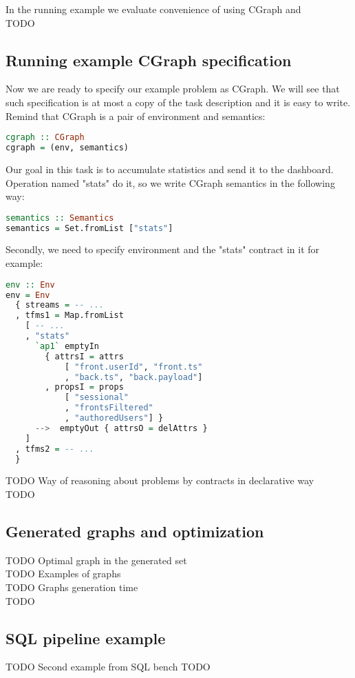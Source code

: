 \label{sec:eval}

In the running example we evaluate convenience of using CGraph and \\
TODO

\subsection{Running example CGraph specification}

Now we are ready to specify our example problem as CGraph.
We will see that such specification is at most a copy of the task description and it is easy to write.
Remind that CGraph is a pair of environment and semantics:
\begin{lstlisting}[language=Haskell]
cgraph :: CGraph
cgraph = (env, semantics)
\end{lstlisting}

Our goal in this task is to accumulate statistics and send it to the dashboard.
Operation named "stats" do it, so we write CGraph semantics in the following way:
\begin{lstlisting}[language=Haskell]
semantics :: Semantics
semantics = Set.fromList ["stats"]
\end{lstlisting}

Secondly, we need to specify environment and the "stats" contract in it for example:
\begin{lstlisting}[language=Haskell]
env :: Env
env = Env
  { streams = -- ...
  , tfms1 = Map.fromList
    [ -- ...
    , "stats"
      `ap1` emptyIn
        { attrsI = attrs
            [ "front.userId", "front.ts"
            , "back.ts", "back.payload"]
        , propsI = props
            [ "sessional"
            , "frontsFiltered"
            , "authoredUsers"] }
      -->  emptyOut { attrsO = delAttrs }
    ]
  , tfms2 = -- ...
  }
\end{lstlisting}



TODO Way of reasoning about problems by contracts in declarative way \\
TODO

\subsection{Generated graphs and optimization}



TODO Optimal graph in the generated set \\
TODO Examples of graphs \\
TODO Graphs generation time \\
TODO

\subsection{SQL pipeline example}

TODO Second example from SQL bench
TODO
